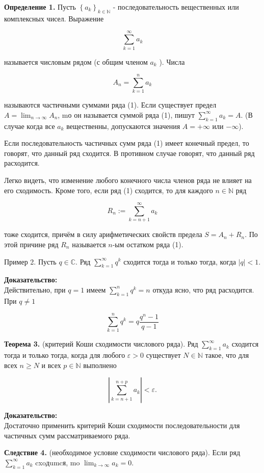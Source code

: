 \documentclass[a4paper,12pt]{article} %
\begin{document}
	\textbf{Определение 1.} Пусть $\left\{a_{k}\right\}_{k \in \mathbb{N}}$ - последовательность вещественных или комплексных чисел. Выражение
	
	$$
	\sum_{k=1}^{\infty} a_{k}
	$$
	
	называется числовым рядом (с общим членом $a_{k}$ ). Числа
	
	$$
	A_{n}=\sum_{k=1}^{n} a_{k}
	$$
	
	называются частичными суммами ряда (1). Если существует предел $A=\lim _{n \rightarrow \infty} A_{n}$, mо он называется суммой ряда (1), пишут $\sum_{k=1}^{\infty} a_{k}=A$. (В случае когда все $a_{k}$ вещественны, допускаются значения $A = +\infty$ или $ -\infty $).
	
	
	Если последовательность частичных сумм ряда (1) имеет конечный предел, то говорят, что данный ряд сходится. В противном случае говорят, что данный ряд расходится.
	
	Легко видеть, что изменение любого конечного числа членов ряда не влияет на его сходимость. Кроме того, если ряд (1) сходится, то для каждого $n \in \mathbb{N}$ ряд
	
	$$
	R_{n}:=\sum_{k=n+1}^{\infty} a_{k}
	$$
	
	тоже сходится, причём в силу арифметических свойств предела $S=A_{n}+R_{n}$. По этой причине ряд $R_{n}$ называется $n$-ым остатком ряда (1).
	
	Пример 2. Пусть $q \in \mathbb{C}$. Ряд $\sum_{k=1}^{\infty} q^{k}$ сходится тогда и только тогда, когда $|q|<1$.
	
	\textbf{Доказательство:\\}
	Действительно, при $q=1$ имеем $\sum_{k=1}^{n} q^{k}=n$ откуда ясно, что ряд расходится. При $q \neq 1$
	
	$$
	\sum_{k=1}^{n} q^{k}=q \frac{q^{n}-1}{q-1}
	$$
	
	\textbf{Теорема 3.} (критерий Коши сходимости числового ряда). Ряд $\sum_{k=1}^{\infty} a_{k}$ сходится тогда и только тогда, когда для любого $\varepsilon>0$ существует $N \in \mathbb{N}$ такое, что для всех $n \geq N$ и всех $p \in \mathbb{N}$ выполнено
	
	$$
	\left|\sum_{k=n+1}^{n+p} a_{k}\right|<\varepsilon .
	$$
	
	\textbf{Доказательство:\\}
	Достаточно применить критерий Коши сходимости последовательности для частичных сумм рассматриваемого ряда.
	
	\textbf{Следствие 4.} (необходимое условие сходимости числового ряда). Если ряд $\sum_{k=1}^{\infty} a_{k}$ cxoдumcя, mo $\lim _{k \rightarrow \infty} a_{k}=0$.
	
\end{document}
